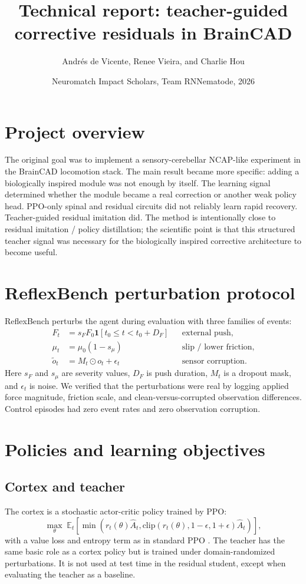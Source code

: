 \documentclass[11pt]{article}
\title{Technical report: teacher-guided corrective residuals in BrainCAD}
\author{Andr\'es de Vicente, Renee Vieira, and Charlie Hou}
\date{Neuromatch Impact Scholars, Team RNNematode, 2026}
\begin{document}
\maketitle

\section{Project overview}
The original goal was to implement a sensory-cerebellar NCAP-like experiment in the BrainCAD locomotion stack.  The main result became more specific: adding a biologically inspired module was not enough by itself.  The learning signal determined whether the module became a real correction or another weak policy head.  PPO-only spinal and residual circuits did not reliably learn rapid recovery.  Teacher-guided residual imitation did.  The method is intentionally close to residual imitation / policy distillation; the scientific point is that this structured teacher signal was necessary for the biologically inspired corrective architecture to become useful.

\section{ReflexBench perturbation protocol}
ReflexBench perturbs the agent during evaluation with three families of events:
\begin{align}
F_t &= s_F F_0 \mathbf{1}[t_0 \le t < t_0 + D_F] && \text{external push},\\
\mu_t &= \mu_0 (1 - s_\mu) && \text{slip / lower friction},\\
\tilde{o}_t &= M_t \odot o_t + \epsilon_t && \text{sensor corruption}.
\end{align}
Here $s_F$ and $s_\mu$ are severity values, $D_F$ is push duration, $M_t$ is a dropout mask, and $\epsilon_t$ is noise.  We verified that the perturbations were real by logging applied force magnitude, friction scale, and clean-versus-corrupted observation differences.  Control episodes had zero event rates and zero observation corruption.

\section{Policies and learning objectives}
\subsection{Cortex and teacher}
The cortex is a stochastic actor-critic policy trained by PPO:
\[
\max_\theta \; \mathbb{E}_t \left[\min(r_t(\theta) \hat{A}_t,
\mathrm{clip}(r_t(\theta), 1-\epsilon, 1+\epsilon)\hat{A}_t)\right],
\]
with a value loss and entropy term as in standard PPO \citep{schulman2017ppo}.  The teacher has the same basic role as a cortex policy but is trained under domain-randomized perturbations.  It is not used at test time in the residual student, except when evaluating the teacher as a baseline.
\end{document}
